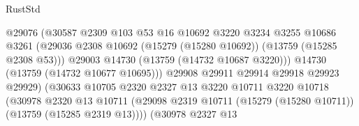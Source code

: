 \begin{lexlean}{RustStd}
\begin{coremodule}
                                            @29076
                                            (@30587
                                              @2309
                                              @103
                                              @53
                                              @16
                                              @10692
                                              @3220
                                              @3234
                                              @3255
                                              @10686
                                              @3261
                                              (@29036
                                                @2308
                                                @10692
                                                (@15279 (@15280 @10692))
                                                (@13759 (@15285 @2308 @53)))
                                              @29003
                                              @14730
                                              (@13759 (@14732 @10687 @3220)))
                                            @14730
                                            (@13759 (@14732 @10677 @10695)))
                                          @29908
                                          @29911
                                          @29914
                                          @29918
                                          @29923
                                          @29929)
                                        (@30633
                                          @10705
                                          @2320
                                          @2327
                                          @13
                                          @3220
                                          @10711
                                          @3220
                                          @10718
                                          (@30978
                                            @2320
                                            @13
                                            @10711
                                            (@29098
                                              @2319
                                              @10711
                                              (@15279 (@15280 @10711))
                                              (@13759 (@15285 @2319 @13))))
                                          (@30978
                                            @2327
                                            @13

\end{coremodule}
\end{lexlean}
